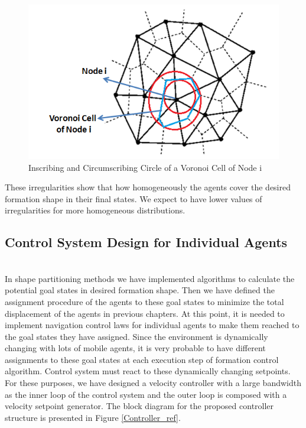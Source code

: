 \begin{figure}[H]
\caption{Inscribing and Circumscribing Circle of a Voronoi Cell of Node i} \label{inscribe_circumscribe}
\centering
\includegraphics[scale = 0.70]{voronoi2}
\end{figure}

These irregularities show that how homogeneously the agents cover the desired formation shape in their final states. We expect to have lower values of irregularities for more homogeneous distributions. 
\subsection{Control System Design for Individual Agents}\hspace{0pt}\label{lqr_design}  \\ 
In shape partitioning methods we have implemented algorithms to calculate the potential goal states in desired formation shape. Then we have defined the assignment procedure of the agents to these goal states to minimize the total displacement of the agents in previous chapters. At this point, it is needed to implement navigation control laws for individual agents to make them reached to the goal states they have assigned. Since the environment is dynamically changing with lots of  mobile agents, it is very probable to have different assignments to these goal states at each execution step of formation control algorithm. Control system must react to these dynamically changing setpoints. For these purposes, we have designed a velocity controller with a large bandwidth as the inner loop of the control system and the outer loop is composed with a velocity setpoint generator. The block diagram for the proposed controller structure is presented in Figure \ref{Controller_ref}.

